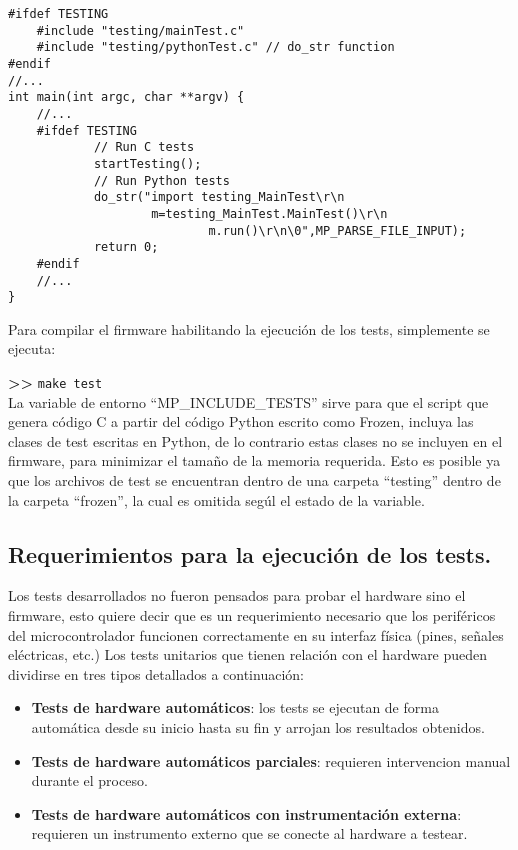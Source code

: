 \begin{lstlisting}[label={lst:mainc},caption=Inclusión de los archivos de test en el main.]
#ifdef TESTING
    #include "testing/mainTest.c"
    #include "testing/pythonTest.c" // do_str function
#endif
//...
int main(int argc, char **argv) {
	//...
	#ifdef TESTING
			// Run C tests
			startTesting();
			// Run Python tests
			do_str("import testing_MainTest\r\n
			        m=testing_MainTest.MainTest()\r\n
							m.run()\r\n\0",MP_PARSE_FILE_INPUT);
			return 0;
	#endif
	//...
}
\end{lstlisting}

Para compilar el firmware habilitando la ejecución de los tests, simplemente se ejecuta:

\textbf{{\fontsize{16}{16}\selectfont \textgreater\textgreater}} \texttt{make test}\\

La variable de entorno “MP\_INCLUDE\_TESTS” sirve para que el script que genera código C a partir del código Python escrito como Frozen, incluya las clases de test escritas en Python, de lo contrario estas clases no se incluyen en el firmware, para minimizar el tamaño de la memoria requerida. Esto es posible ya que los archivos de test se encuentran dentro de una carpeta “testing” dentro de la carpeta “frozen”, la cual es omitida segúl el estado de la variable.

\subsection{Requerimientos para la ejecución de los tests.}
\label{sec:requerimientosEjecucionTests}

Los tests desarrollados no fueron pensados para probar el hardware sino el firmware, esto quiere decir que es un requerimiento necesario que los periféricos del microcontrolador funcionen correctamente en su interfaz física (pines, señales eléctricas, etc.)
Los tests unitarios que tienen relación con el hardware pueden dividirse en tres tipos \cite{tdd} detallados a continuación:

\begin{itemize}
	\item \textbf{Tests de hardware automáticos}: los tests se ejecutan de forma automática desde su inicio hasta su fin y arrojan los resultados obtenidos.
	\item \textbf{Tests de hardware automáticos parciales}: requieren intervencion manual durante el proceso.
	\item \textbf{Tests de hardware automáticos con instrumentación externa}: requieren un instrumento externo que se conecte al hardware a testear.
\end{itemize}

